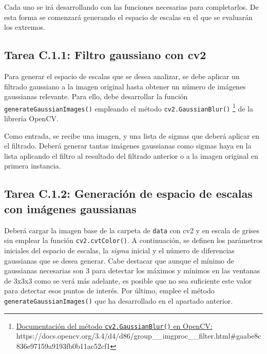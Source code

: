 Cada uno se irá desarrollando con las funciones necesarias para completarlos. De esta forma se comenzará generando el espacio de escalas en el que se evaluarán los extremos.

\subsection*{Tarea C.1.1: Filtro gaussiano con cv2}
{}

Para generar el espacio de escalas que se desea analizar, se debe aplicar un filtrado gaussiano a la imagen original hasta obtener un número de imágenes gaussianas relevante. Para ello, debe desarrollar la función \texttt{generateGaussianImages()} empleando el método \texttt{cv2.GaussianBlur()} \footnote{ \href{https://docs.opencv.org/3.4/d4/d86/group\_\_imgproc\_\_filter.html\#gaabe8c836e97159a9193fb0b11ac52cf1}{Documentación del método \texttt{cv2.GaussianBlur()} en OpenCV:} \\{https://docs.opencv.org/3.4/d4/d86/group\_\_imgproc\_\_filter.html\#gaabe8c836e97159a9193fb0b11ac52cf1}} de la librería OpenCV.


Como entrada, se recibe una imagen, y una lista de sigmas que deberá aplicar en el filtrado. Deberá generar tantas imágenes gaussianas como sigmas haya en la lista aplicando el filtro al resultado del filtrado anterior o a la imagen original en primera instancia.

\subsection*{Tarea C.1.2: Generación de espacio de escalas con imágenes gaussianas}

Deberá cargar la imagen base de la carpeta de \texttt{data} con cv2 y en escala de grises sin emplear la función \texttt{cv2.cvtColor()}. A continuación, se definen los parámetros iniciales del espacio de escalas, la \textit{sigma} inicial y el número de diferencias gaussianas que se desea generar. Cabe destacar que aunque el mínimo de gaussianas necesarias son 3 para detectar los máximos y mínimos en las ventanas de 3x3x3 como se verá más adelante, es posible que no sea suficiente este valor para detectar esos puntos de interés. Por último, emplee el método \texttt{generateGaussianImages()} que ha desarrollado en el apartado anterior.

